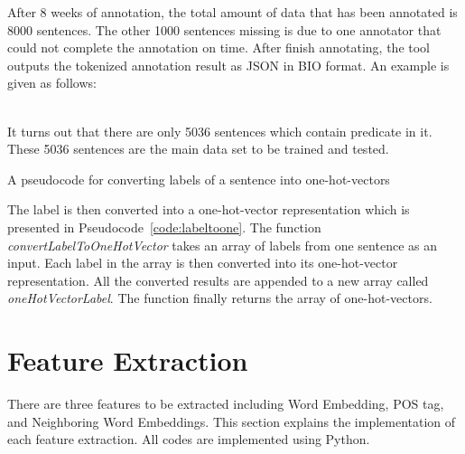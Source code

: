 After 8 weeks of annotation, the total amount of data that has been annotated is 8000 sentences. The other 1000 sentences missing is due to one annotator that could not complete the annotation on time. After finish annotating, the tool outputs the tokenized annotation result as JSON in BIO format. An example is given as follows:

\\

It turns out that there are only 5036 sentences which contain predicate in it. These 5036 sentences are the main data set to be trained and tested.

\begin{kode}
	
	
	\caption{A pseudocode for converting labels of a sentence into one-hot-vectors}
	\label{code:labeltoone}
\end{kode}

The label is then converted into a one-hot-vector representation which is presented in Pseudocode~\ref{code:labeltoone}. The function \textit{convertLabelToOneHotVector} takes an array of labels from one sentence as an input. Each label in the array is then converted into its one-hot-vector representation. All the converted results are appended to a new array called \textit{oneHotVectorLabel}. The function finally returns the array of one-hot-vectors.

\section{Feature Extraction}
There are three features to be extracted including Word Embedding, POS tag, and Neighboring Word Embeddings. This section explains the implementation of each feature extraction. All codes are implemented using Python.

